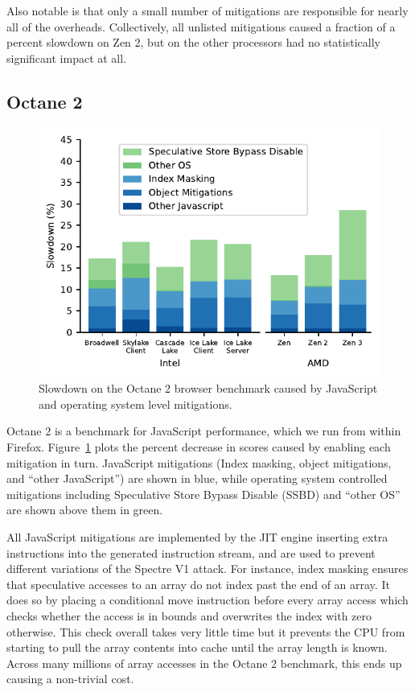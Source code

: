 Also notable is that only a small number of mitigations are responsible for nearly all of the overheads.
Collectively, all unlisted mitigations caused a fraction of a percent slowdown on Zen 2, but on the other processors had no statistically significant impact at all.

\subsection{Octane 2}
\label{sec:benchmarks:octane-2}

\begin{figure}[t]
    \includegraphics[width=\columnwidth]{plots/octane2.pdf}
    \caption{Slowdown on the Octane 2 browser benchmark caused by JavaScript and operating system level mitigations.}
    \label{fig:octane2}
\end{figure}

Octane 2 is a benchmark for JavaScript performance, which we run from within Firefox.
Figure~\ref{fig:octane2} plots the percent decrease in scores caused by enabling each mitigation in turn.
JavaScript mitigations (Index masking, object mitigations, and ``other JavaScript'') are shown in blue, while operating system controlled mitigations including Speculative Store Bypass Disable (SSBD) and ``other OS'' are shown above them in green.

All JavaScript mitigations are implemented by the JIT engine inserting extra instructions into the generated instruction stream, and are used to prevent different variations of the Spectre V1 attack.
For instance, index masking ensures that speculative accesses to an array do not index past the end of an array.
It does so by placing a conditional move instruction before every array access which checks whether the access is in bounds and overwrites the index with zero otherwise.
This check overall takes very little time but it prevents the CPU from starting to pull the array contents into cache until the array length is known.
Across many millions of array accesses in the Octane 2 benchmark, this ends up causing a non-trivial cost.

